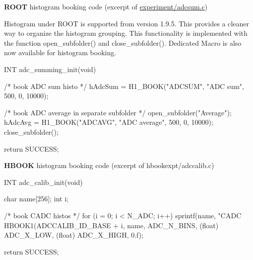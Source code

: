 \begin{DoxyItemize}
\item {\bfseries ROOT} histogram booking code (excerpt of \hyperlink{adcsum_8c}{experiment/adcsum.c})
\begin{DoxyItemize}
\item \label{DataAnalysis_Folder}
\hypertarget{DataAnalysis_Folder}{}
 Histogram under ROOT is supported from version 1.9.5. This provides a cleaner way to organize the histogram grouping. This functionality is implemented with the function open\_\-subfolder() and close\_\-subfolder(). Dedicated Macro is also now available for histogram booking. 
\begin{DoxyCode}
INT adc_summing_init(void)
{
   /* book ADC sum histo */
   hAdcSum = H1_BOOK("ADCSUM", "ADC sum", 500, 0, 10000);

   /* book ADC average in separate subfolder */
   open_subfolder("Average");
   hAdcAvg = H1_BOOK("ADCAVG", "ADC average", 500, 0, 10000);
   close_subfolder();

   return SUCCESS;
}
\end{DoxyCode}

\end{DoxyItemize}
\item {\bfseries HBOOK} histogram booking code (excerpt of hbookexpt/adccalib.c) 
\begin{DoxyCode}
INT adc_calib_init(void)
{
   char name[256];
   int i;

   /* book CADC histos */
   for (i = 0; i < N_ADC; i++) {
      sprintf(name, "CADC%
      HBOOK1(ADCCALIB_ID_BASE + i, name, ADC_N_BINS,
             (float) ADC_X_LOW, (float) ADC_X_HIGH, 0.f);
   }

   return SUCCESS;
}
\end{DoxyCode}

\end{DoxyItemize}


